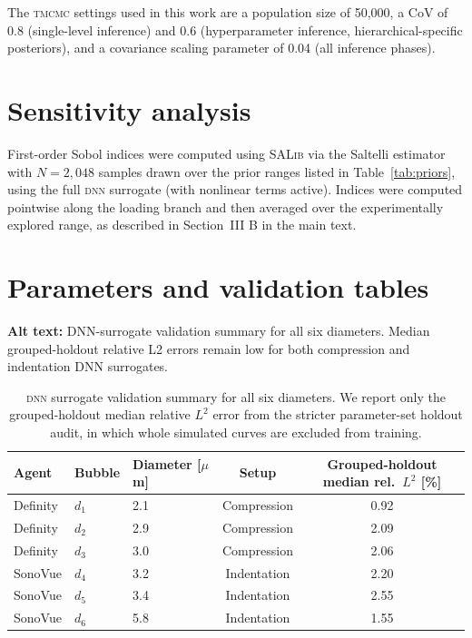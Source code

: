 \documentclass[%
 aip,
 jcp,
 amsmath,amssymb,
 preprint,%
]{revtex4-1}
\begin{document}
The \textsc{tmcmc} settings used in this work are a population size of 50{,}000, a CoV of 0.8 (single-level inference) and 0.6 (hyperparameter inference, hierarchical-specific posteriors), and a covariance scaling parameter of 0.04 (all inference phases).

\clearpage
\section{Sensitivity analysis}
\label{app:sensitivity}
First-order Sobol indices were computed using \textsc{SALib}
\cite{herman2017salib} via the Saltelli estimator with $N = 2,048$
samples drawn over the prior ranges listed in Table~\ref{tab:priors}, using the full \textsc{dnn} surrogate (with nonlinear terms
active). Indices were computed pointwise along the loading branch and
then averaged over the experimentally explored range, as described in
Section~III B in the main text.

\section{Parameters and validation tables}
\begin{table}[!htbp]
\caption{\label{tab:surrogate_validation}
\textsc{dnn} surrogate validation summary for all six diameters. We report only the grouped-holdout median relative $L^2$ error from the stricter parameter-set holdout audit, in which whole simulated curves are excluded from training.}
\noindent\textbf{Alt text:} DNN-surrogate validation summary for all six diameters. Median grouped-holdout relative L2 errors remain low for both compression and indentation DNN surrogates.
\par\vspace{0.75\baselineskip}
\begin{ruledtabular}
\begin{tabular}{lllcc}
Agent & Bubble & Diameter [$\mu$m] & Setup & Grouped-holdout median rel.\ $L^2$ [\%] \\
\hline
Definity & $d_1$ & 2.1 & Compression & 0.92 \\
Definity & $d_2$ & 2.9 & Compression & 2.09 \\
Definity & $d_3$ & 3.0 & Compression & 2.06 \\
\hline
SonoVue & $d_4$ & 3.2 & Indentation & 2.20 \\
SonoVue & $d_5$ & 3.4 & Indentation & 2.55 \\
SonoVue & $d_6$ & 5.8 & Indentation & 1.55 \\
\end{tabular}
\end{ruledtabular}
\end{table}
\end{document}
